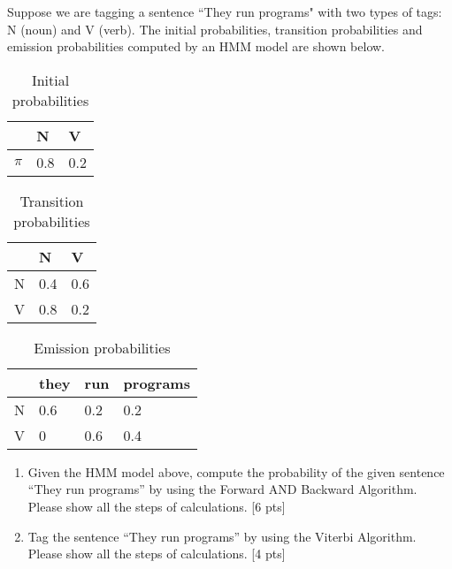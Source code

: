 Suppose we are tagging a sentence ``They run programs" with two types of tags: N (noun) and V (verb). The initial probabilities, transition probabilities and emission probabilities computed by an HMM model are shown below.

\begin{table}[h]
\centering
\begin{tabular}{|l|l|l|}
\hline
       & N & V  \\ \hline
$\pi$  & 0.8   & 0.2      \\ \hline
\end{tabular}\caption{Initial probabilities} \label{Tab:Initial}
\end{table}

\begin{table}[h]
\centering
\begin{tabular}{|l|l|l|}
\hline
       & N & V  \\ \hline
N  & 0.4   & 0.6      \\ \hline
V  & 0.8   & 0.2      \\ \hline
\end{tabular}\caption{Transition probabilities} \label{Tab:Trans}
\end{table}

\begin{table}[h]
\centering
\begin{tabular}{|l|l|l|l|}
\hline
       & they & run & programs  \\ \hline
N  & 0.6   & 0.2  &0.2      \\ \hline
V  & 0   & 0.6  &0.4      \\ \hline
\end{tabular}\caption{Emission probabilities} \label{Tab:Emission}
\end{table}

\begin{enumerate}
    \item Given the HMM model above, compute the probability of the given sentence ``They run programs'' by using the Forward AND Backward Algorithm. Please show all the steps of calculations.  
    [6 pts]
    \item Tag the sentence  ``They run programs'' by using the Viterbi Algorithm. Please show all the steps of calculations. [4 pts]
\end{enumerate}

